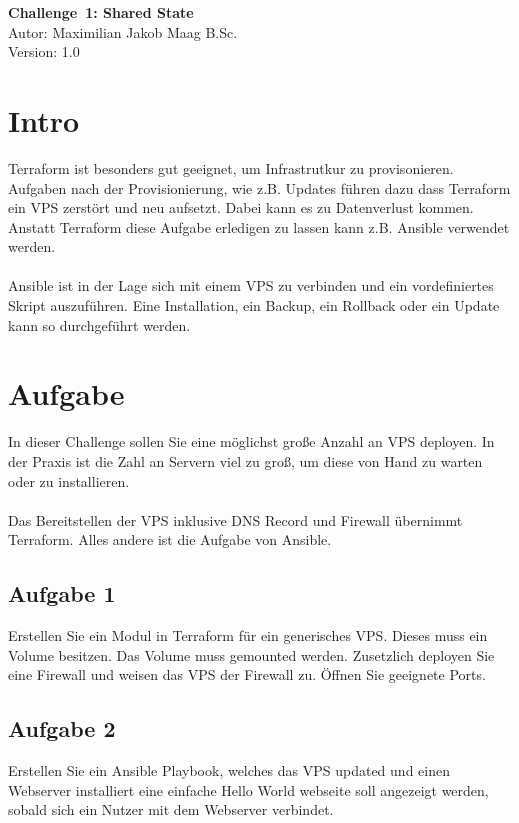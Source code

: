 \documentclass{article}
\begin{document}
    \begin{center}
        \Large \textbf{Challenge 1: Shared State} \\ [6pt]
        \normalsize
        Autor: Maximilian Jakob Maag B.Sc. \\
        Version: 1.0
    \end{center}
    \section{Intro}
    Terraform ist besonders gut geeignet, um Infrastrutkur zu provisonieren.
    Aufgaben nach der Provisionierung, wie z.B. Updates führen dazu dass Terraform ein VPS zerstört und neu aufsetzt.
    Dabei kann es zu Datenverlust kommen. Anstatt Terraform diese Aufgabe erledigen zu lassen kann z.B. Ansible verwendet werden.
    \\ \\
    Ansible ist in der Lage sich mit einem VPS zu verbinden und ein vordefiniertes Skript auszuführen.
    Eine Installation, ein Backup, ein Rollback oder ein Update kann so durchgeführt werden.

    \section{Aufgabe}
    In dieser Challenge sollen Sie eine möglichst große Anzahl an VPS deployen.
    In der Praxis ist die Zahl an Servern viel zu groß, um diese von Hand zu warten oder zu installieren. \\ \\
    Das Bereitstellen der VPS inklusive DNS Record und Firewall übernimmt Terraform. Alles andere ist die Aufgabe von Ansible.

    \subsection{Aufgabe 1}
    Erstellen Sie ein Modul in Terraform für ein generisches VPS. Dieses muss ein Volume besitzen. Das Volume  muss gemounted werden.
    Zusetzlich deployen Sie eine Firewall und  weisen das VPS der Firewall zu. Öffnen Sie geeignete Ports.

    \subsection{Aufgabe 2}
    Erstellen Sie ein Ansible Playbook, welches das VPS updated und einen Webserver installiert eine einfache Hello World  webseite soll angezeigt werden, sobald sich ein Nutzer mit dem Webserver verbindet.
\end{document}
